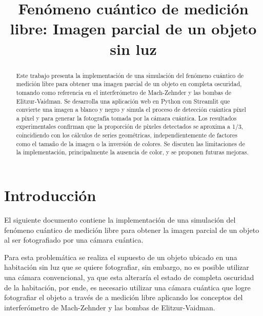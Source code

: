 \documentclass[conference]{IEEEtran}
\begin{document}
\title{Fenómeno cuántico de medición libre: Imagen parcial de un objeto sin luz}

\author{
}

\maketitle

\begin{abstract}
Este trabajo presenta la implementación de una simulación del fenómeno cuántico de medición libre para obtener una imagen parcial de un objeto en completa oscuridad, tomando 
como referencia en el interferómetro de Mach-Zehnder y las bombas de Elitzur-Vaidman. Se desarrolla una aplicación web en Python con Streamlit que convierte una imagen a 
blanco y negro y simula el proceso de detección cuántica píxel a píxel y para generar la fotografía tomada por la cámara cuántica. Los resultados experimentales confirman que 
la proporción de píxeles detectados se aproxima a 1/3, coincidiendo con los cálculos de series geométricas, independientemente de factores como el tamaño de la imagen o la 
    inversión de colores. Se discuten las limitaciones de la implementación, principalmente la ausencia de color, y se proponen futuras mejoras.
\end{abstract}

\section{Introducción}
El siguiente documento contiene la implementación de una simulación del fenómeno cuántico de medición libre para obtener la
imagen parcial de un objeto al ser fotografiado por una cámara cuántica.

Para esta problemática se realiza el supuesto de un objeto ubicado en una habitación sin luz que se quiere fotografiar, sin embargo, 
no es posible utilizar una cámara convencional, ya que esta alteraría el estado de completa oscuridad de la habitación, por ende, es necesario 
utilizar una cámara cuántica que logre fotografiar el objeto a través de a medición libre aplicando los conceptos del interferómetro de Mach-Zehnder
y las bombas de Elitzur-Vaidman.
\end{document}
